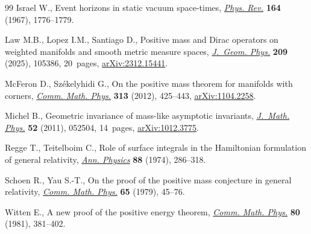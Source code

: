 \documentclass[pdftex]{sigma}
\numberwithin{equation}{section}
\theoremstyle{definition}
\begin{document}
\begin{thebibliography}{99}
Israel W., Event horizons in static vacuum space-times,
 \href{https://doi.org/10.1103/PhysRev.164.1776}{\textit{Phys. Rev.}}
 \textbf{164} (1967), 1776--1779.

Law M.B., Lopez I.M., Santiago D., Positive mass and {D}irac operators on
 weighted manifolds and smooth metric measure spaces,
 \href{https://doi.org/10.1016/j.geomphys.2024.105386}{\textit{J.~Geom.
 Phys.}} \textbf{209} (2025), 105386, 20~pages,
 \href{http://arxiv.org/abs/2312.15441}{arXiv:2312.15441}.

McFeron D., Sz\'{e}kelyhidi G., On the positive mass theorem for manifolds with
 corners, \href{https://doi.org/10.1007/s00220-012-1498-8}{\textit{Comm. Math.
 Phys.}} \textbf{313} (2012), 425--443,
 \href{http://arxiv.org/abs/1104.2258}{arXiv:1104.2258}.

Michel B., Geometric invariance of mass-like asymptotic invariants,
 \href{https://doi.org/10.1063/1.3579137}{\textit{J.~Math. Phys.}} \textbf{52}
 (2011), 052504, 14~pages,
 \href{http://arxiv.org/abs/1012.3775}{arXiv:1012.3775}.

Regge T., Teitelboim C., Role of surface integrals in the {H}amiltonian
 formulation of general relativity,
 \href{https://doi.org/10.1016/0003-4916(74)90404-7}{\textit{Ann. Physics}}
 \textbf{88} (1974), 286--318.

Schoen R., Yau S.-T., On the proof of the positive mass conjecture in general
 relativity, \href{https://doi.org/10.1007/BF01940959}{\textit{Comm. Math.
 Phys.}} \textbf{65} (1979), 45--76.

Witten E., A new proof of the positive energy theorem,
 \href{https://doi.org/10.1007/BF01208277}{\textit{Comm. Math. Phys.}}
 \textbf{80} (1981), 381--402.

\end{thebibliography}\LastPageEnding
\end{document}
